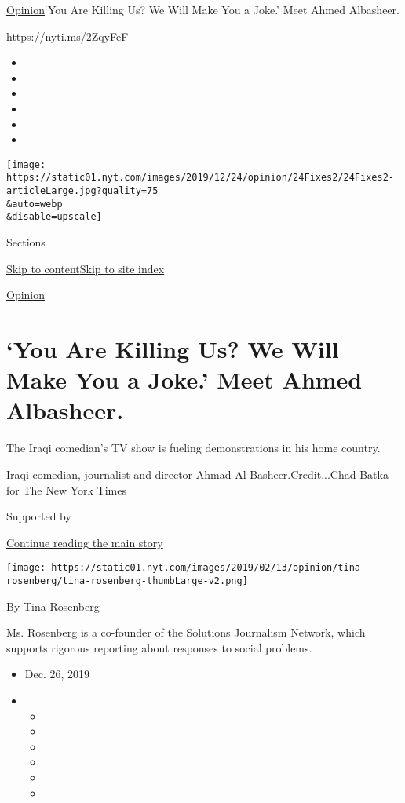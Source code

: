 \href{/section/opinion}{Opinion}\textbar{}`You Are Killing Us? We Will
Make You a Joke.' Meet Ahmed Albasheer.

\href{https://nyti.ms/2ZqyFeF}{https://nyti.ms/2ZqyFeF}

\begin{itemize}
\item
\item
\item
\item
\item
\item
\end{itemize}

\texttt{[image: https://static01.nyt.com/images/2019/12/24/opinion/24Fixes2/24Fixes2-articleLarge.jpg?quality=75\\\&auto=webp\\\&disable=upscale]}

Sections

\protect\hyperlink{site-content}{Skip to
content}\protect\hyperlink{site-index}{Skip to site index}

\href{/section/opinion}{Opinion}

\hypertarget{you-are-killing-us-we-will-make-you-a-joke-meet-ahmed-albasheer}{%
\section{`You Are Killing Us? We Will Make You a Joke.' Meet Ahmed
Albasheer.}\label{you-are-killing-us-we-will-make-you-a-joke-meet-ahmed-albasheer}}

The Iraqi comedian's TV show is fueling demonstrations in his home
country.

Iraqi comedian, journalist and director Ahmad Al-Basheer.Credit...Chad
Batka for The New York Times

Supported by

\protect\hyperlink{after-sponsor}{Continue reading the main story}

\texttt{[image: https://static01.nyt.com/images/2019/02/13/opinion/tina-rosenberg/tina-rosenberg-thumbLarge-v2.png]}

By Tina Rosenberg

Ms. Rosenberg is a co-founder of the Solutions Journalism Network, which
supports rigorous reporting about responses to social problems.

\begin{itemize}
\item
  Dec. 26, 2019
\item
  \begin{itemize}
  \item
  \item
  \item
  \item
  \item
  \item
  \end{itemize}
\end{itemize}

